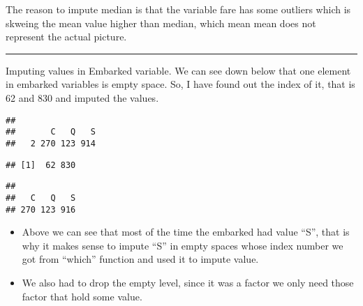 \documentclass[]{article}
\newenvironment{Shaded}{\begin{snugshade}}{\end{snugshade}}
\newcommand{\KeywordTok}[1]{\textcolor[rgb]{0.13,0.29,0.53}{\textbf{#1}}}
\newcommand{\DecValTok}[1]{\textcolor[rgb]{0.00,0.00,0.81}{#1}}
\newcommand{\StringTok}[1]{\textcolor[rgb]{0.31,0.60,0.02}{#1}}
\newcommand{\OperatorTok}[1]{\textcolor[rgb]{0.81,0.36,0.00}{\textbf{#1}}}
\newcommand{\NormalTok}[1]{#1}
\providecommand{\tightlist}{%
  \setlength{\itemsep}{0pt}\setlength{\parskip}{0pt}}
\begin{document}
The reason to impute median is that the variable fare has some outliers
which is skweing the mean value higher than median, which mean mean does
not represent the actual picture.

\begin{center}\rule{0.5\linewidth}{\linethickness}\end{center}

Imputing values in Embarked variable. We can see down below that one
element in embarked variables is empty space. So, I have found out the
index of it, that is 62 and 830 and imputed the values.

\begin{Shaded}
\end{Shaded}

\begin{verbatim}
## 
##       C   Q   S 
##   2 270 123 914
\end{verbatim}

\begin{Shaded}
\end{Shaded}

\begin{verbatim}
## [1]  62 830
\end{verbatim}

\begin{Shaded}
\end{Shaded}

\begin{verbatim}
## 
##   C   Q   S 
## 270 123 916
\end{verbatim}

\begin{itemize}
\tightlist
\item
  Above we can see that most of the time the embarked had value ``S'',
  that is why it makes sense to impute ``S'' in empty spaces whose index
  number we got from ``which'' function and used it to impute value.
\item
  We also had to drop the empty level, since it was a factor we only
  need those factor that hold some value.
\end{itemize}
\end{document}
